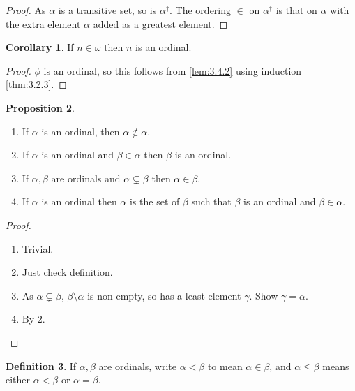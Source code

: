 \documentclass{article}
\theoremstyle{definition}\newtheorem{definition}{Definition}[subsection]
\theoremstyle{definition}\newtheorem{remark}[definition]{Remark}
\theoremstyle{definition}\newtheorem*{example}{Example}
\theoremstyle{definition}\newtheorem*{note}{Note}
\newtheorem{proposition}[definition]{Proposition}
\newtheorem{corollary}[definition]{Corollary}
\begin{document}
\begin{proof}
As $ \alpha $ is a transitive set, so is $ \alpha^\dagger $. The ordering $ \in $ on $ \alpha^\dagger $ is that on $ \alpha $ with the extra element $ \alpha $ added as a greatest element.
\end{proof}

\begin{corollary}
If $ n \in \omega $ then $ n $ is an ordinal.
\end{corollary}

\begin{proof}
$ \phi $ is an ordinal, so this follows from \ref{lem:3.4.2} using induction \ref{thm:3.2.3}.
\end{proof}

\begin{proposition}
\label{prop:3.4.4}
\hfill
\begin{enumerate}
\item If $ \alpha $ is an ordinal, then $ \alpha \notin \alpha $.
\item If $ \alpha $ is an ordinal and $ \beta \in \alpha $ then $ \beta $ is an ordinal.
\item If $ \alpha, \beta $ are ordinals and $ \alpha \subsetneq \beta $ then $ \alpha \in \beta $.
\item If $ \alpha $ is an ordinal then $ \alpha $ is the set of $ \beta $ such that $ \beta $ is an ordinal and $ \beta \in \alpha $.
\end{enumerate}
\end{proposition}

\begin{proof}
\hfill
\begin{enumerate}
\item Trivial.
\item Just check definition.
\item As $ \alpha \subsetneq \beta $, $ \beta \setminus \alpha $ is non-empty, so has a least element $ \gamma $. Show $ \gamma = \alpha $.
\item By $ 2 $.
\end{enumerate}
\end{proof}

\begin{definition}
If $ \alpha, \beta $ are ordinals, write $ \alpha < \beta $ to mean $ \alpha \in \beta $, and $ \alpha \le \beta $ means either $ \alpha < \beta $ or $ \alpha = \beta $.
\end{definition}
\end{document}
